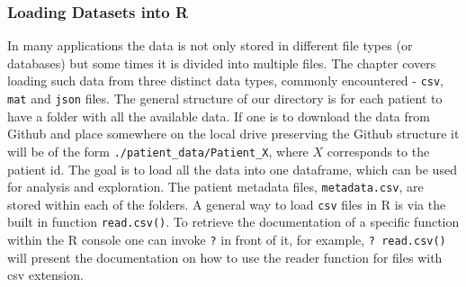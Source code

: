 \subsubsection{Loading Datasets into R}
In many applications the data is not only stored in different file types (or databases) but some times it is divided into multiple files. The chapter covers loading such data from three distinct data types, commonly encountered - \verb|csv|, \verb|mat| and \verb|json| files. The general structure of our directory is for each patient to have a folder with all the available data. If one is to download the data from Github and place somewhere on the local drive preserving the Github structure it will be of the form \verb|./patient_data/Patient_X|, where $X$ corresponds to the patient id. The goal is to load all the data into one dataframe, which can be used for analysis and exploration.
The patient metadata files, \verb|metadata.csv|, are stored within each of the folders. A general way to load \verb|csv| files in R is via the built in function \verb|read.csv()|. To retrieve the documentation of a specific function within the R console one can invoke \verb|?| in front of it, for example, \verb|? read.csv()| will present the documentation on how to use the reader function for files with csv extension.

